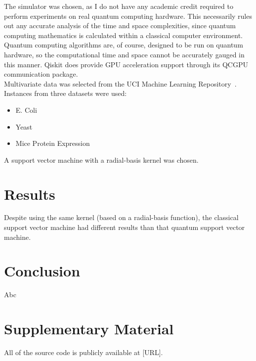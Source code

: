\documentclass{article}
\begin{document}
  The simulator was chosen, as I do not have any academic credit required to perform experiments on real quantum computing hardware. This necessarily rules out any accurate analysis of the time and space complexities, since quantum computing mathematics is calculated within a classical computer environment. Quantum computing algorithms are, of course, designed to be run on quantum hardware, so the computational time and space cannot be accurately gauged in this manner. Qiskit does provide GPU acceleration support through its QCGPU communication package.~\cite{qcgpu} \\

  Multivariate data was selected from the UCI Machine Learning Repository~\cite{mlrepo}. Instances from three datasets were used:

    \begin{itemize}
      \item E. Coli~\cite{ecoli}
      \item Yeast~\cite{yeast}
      \item Mice Protein Expression~\cite{mouse}
    \end{itemize}

  A support vector machine with a radial-basis kernel was chosen.

\section{Results}
  Despite using the same kernel (based on a radial-basis function), the classical support vector machine had different results than that quantum support vector machine.

\section{Conclusion}
  Abc

\section{Supplementary Material}
All of the source code is publicly available at [URL].
\end{document}
